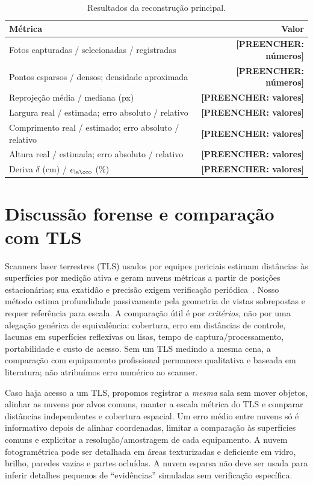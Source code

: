 \documentclass[10pt,a4paper]{article}
\newcommand{\Resultado}[1]{\textcolor{red!65!black}{\textbf{[PREENCHER: #1]}}}
\begin{document}
\begin{table}[h]
\centering\small
\caption{Resultados da reconstrução principal.}
\begin{tabularx}{\linewidth}{X r}
\toprule
Métrica & Valor \\
\midrule
Fotos capturadas / selecionadas / registradas & \Resultado{números} \\
Pontos esparsos / densos; densidade aproximada & \Resultado{números} \\
Reprojeção média / mediana (px) & \Resultado{valores} \\
Largura real / estimada; erro absoluto / relativo & \Resultado{valores} \\
Comprimento real / estimado; erro absoluto / relativo & \Resultado{valores} \\
Altura real / estimada; erro absoluto / relativo & \Resultado{valores} \\
Deriva $\delta$ (cm) / $e_{\rm laço}$ (\%) & \Resultado{valores} \\
\bottomrule
\end{tabularx}
\end{table}

\section{Discussão forense e comparação com TLS}
Scanners laser terrestres (TLS) usados por equipes periciais estimam distâncias às superfícies por medição ativa e geram nuvens métricas a partir de posições estacionárias; sua exatidão e precisão exigem verificação periódica~\cite{nist}. Nosso método estima profundidade passivamente pela geometria de vistas sobrepostas e requer referência para escala. A comparação útil é por \emph{critérios}, não por uma alegação genérica de equivalência: cobertura, erro em distâncias de controle, lacunas em superfícies reflexivas ou lisas, tempo de captura/processamento, portabilidade e custo de acesso. Sem um TLS medindo a mesma cena, a comparação com equipamento profissional permanece qualitativa e baseada em literatura; não atribuímos erro numérico ao scanner.

Caso haja acesso a um TLS, propomos registrar a \emph{mesma} sala sem mover objetos, alinhar as nuvens por alvos comuns, manter a escala métrica do TLS e comparar distâncias independentes e cobertura espacial. Um erro médio entre nuvens só é informativo depois de alinhar coordenadas, limitar a comparação às superfícies comuns e explicitar a resolução/amostragem de cada equipamento. A nuvem fotogramétrica pode ser detalhada em áreas texturizadas e deficiente em vidro, brilho, paredes vazias e partes ocluídas. A nuvem esparsa não deve ser usada para inferir detalhes pequenos de ``evidências'' simuladas sem verificação específica.
\end{document}
